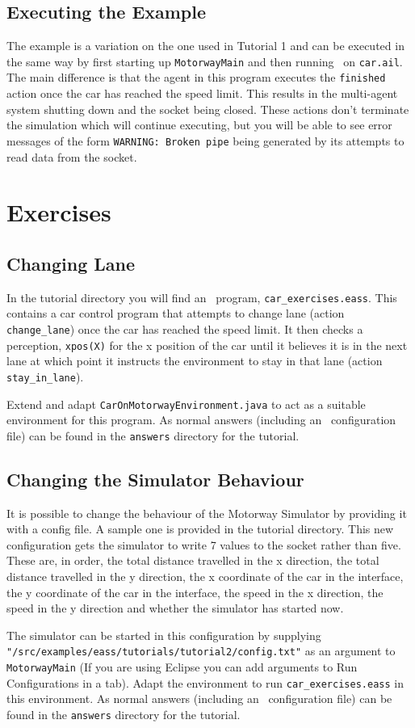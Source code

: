 \documentclass[a4]{article}
\begin{document}
\subsection{Executing the Example}
The example is a variation on the one used in Tutorial 1 and can be executed in the same way by first starting up \texttt{MotorwayMain} and then running \ail\ on \texttt{car.ail}.  The main difference is that the agent in this program executes the \lstinline{finished} action once the car has reached the speed limit.  This results in the multi-agent system shutting down and the socket being closed.  These actions don't terminate the simulation which will continue executing, but you will be able to see error messages of the form \texttt{WARNING: Broken pipe} being generated by its attempts to read data from the socket.

\section{Exercises}
\subsection{Changing Lane}
In the tutorial directory you will find an \eass\ program, \texttt{car\_exercises.eass}.  This contains a car control program that attempts to change lane (action \lstinline{change_lane}) once the car has reached the speed limit.  It then checks a perception, \lstinline{xpos(X)} for the x position of the car until it believes it is in the next lane at which point it instructs the environment to stay in that lane (action \lstinline{stay_in_lane}). 

Extend and adapt \texttt{CarOnMotorwayEnvironment.java} to act as a suitable environment for this program.  As normal answers (including an \ail\ configuration file) can be found in the \texttt{answers} directory for the tutorial.

\subsection{Changing the Simulator Behaviour}
It is possible to change the behaviour of the Motorway Simulator by providing it with a config file.  A sample one is provided in the tutorial directory.  This new configuration gets the simulator to write 7 values to the socket rather than five.  These are, in order, the total distance travelled in the x direction, the total distance travelled in the y direction, the x coordinate of the car in the interface, the y coordinate of the car in the interface, the speed in the x direction, the speed in the y direction and whether the simulator has started now.

\begin{sloppypar}
The simulator can be started in this configuration by supplying \texttt{"/src/examples/eass/tutorials/tutorial2/config.txt"} as an argument to \texttt{MotorwayMain} (If you are using Eclipse you can add arguments to Run Configurations in a tab).  Adapt the environment to run \texttt{car\_exercises.eass} in this environment.  As normal answers (including an \ail\ configuration file) can be found in the \texttt{answers} directory for the tutorial.
\end{sloppypar}
\end{document}
